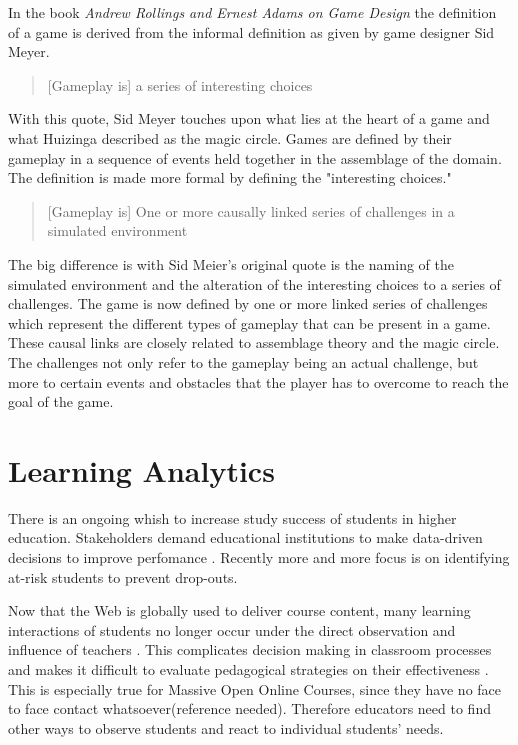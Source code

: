 \documentclass[11pt]{article}
\begin{document}
In the book \emph{Andrew Rollings and Ernest Adams on Game Design} \cite{Rollings2003} the definition of a game is derived from the informal definition as given by game designer Sid Meyer.
\begin{quotation}
	[Gameplay is] a series of interesting choices
\end{quotation}

With this quote, Sid Meyer touches upon what lies at the heart of a game and what Huizinga described as the magic circle. Games are defined by their gameplay in a sequence of events held together in the assemblage of the domain. The definition is made more formal by defining the "interesting choices." 

\begin{quotation}
	[Gameplay is] One or more causally linked series of challenges in a simulated environment \cite{Rollings2003}
\end{quotation}

The big difference is with Sid Meier's original quote is the naming of the simulated environment and the alteration of the interesting choices to a series of challenges. The game is now defined by one or more linked series of challenges which represent the different types of gameplay that can be present in a game. These causal links are closely related to assemblage theory and the magic circle. The challenges not only refer to the gameplay being an actual challenge, but more to certain events and obstacles that the player has to overcome to reach the goal of the game.






\section{Learning Analytics}\label{sec:learninganalytics}
There is an ongoing whish to increase study success of students in higher education. Stakeholders demand educational institutions to make data-driven decisions to improve perfomance \cite{Ferguson2012a}. Recently more and more focus is on identifying at-risk students to prevent drop-outs.

Now that the Web is globally used to deliver course content, many learning interactions of students no longer occur under the direct observation and influence of teachers \cite{Sheard2003}. This complicates decision making in classroom processes and makes it difficult to evaluate pedagogical strategies on their effectiveness \cite{Romero2007}. This is especially true for Massive Open Online Courses, since they have no face to face contact whatsoever(reference needed). Therefore educators need to find other ways to observe students and react to individual students' needs.
\end{document}
